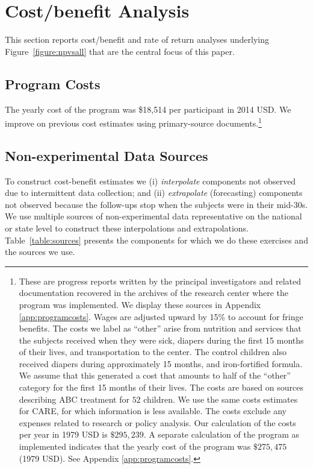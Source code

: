 \section{Cost/benefit Analysis} \label{section:cbaresults}

This section reports cost/benefit and rate of return analyses underlying Figure~\ref{figure:npvsall} that are the central focus of this paper.

\subsection{Program Costs} \label{section:programscosts}

The yearly cost of the program was \$18,514 per participant in 2014 USD. We improve on previous cost estimates using primary-source documents.\footnote{These are progress reports written by the principal investigators and related documentation recovered in the archives of the research center where the program was implemented. We display these sources in Appendix \ref{app:programcosts}. Wages are adjusted upward by 15\% to account for fringe benefits. The costs we label as ``other'' arise from nutrition and services that the subjects received when they were sick, diapers during the first 15 months of their lives, and transportation to the center. The control children also received diapers during approximately 15 months, and iron-fortified formula. We assume that this generated a cost that amounts to half of the ``other'' category for the first 15 months of their lives. The costs are based on sources describing ABC treatment for $52$ children. We use the same costs estimates for CARE, for which information is less available. The costs exclude any expenses related to research or policy analysis. Our calculation of the costs per year in 1979 USD is $\$295,239$. A separate calculation of the program as implemented indicates that the yearly cost of the program was $\$275,475$ (1979 USD). See Appendix \ref{app:programcosts}.}

\subsection{Non-experimental Data Sources}

To construct cost-benefit estimates we (i) \textit{interpolate} components not observed due to intermittent data collection; and (ii) \textit{extrapolate} (forecasting) components not observed because the follow-ups stop when the subjects were in their mid-30s. We use multiple sources of non-experimental data representative on the national or state level to construct these interpolations and extrapolations. Table~\ref{table:sources} presents the components for which we do these exercises and the sources we use.

